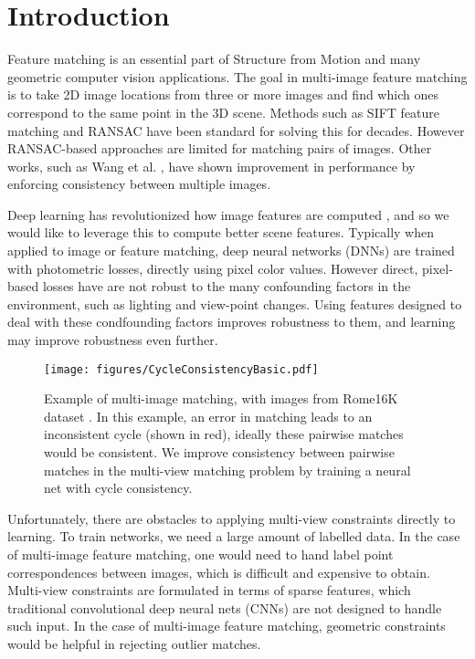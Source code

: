 \documentclass[10pt,twocolumn,letterpaper]{article}
\begin{document}
\section{Introduction}

Feature matching is an essential part of Structure from Motion and many geometric computer vision applications.
The goal in multi-image feature matching is to take 2D image locations from three or more images and find which ones correspond to the same point in the 3D scene.
Methods such as SIFT feature matching \cite{lowe2004distinctive} and RANSAC \cite{fischler1981random} have been standard for solving this for decades.
However RANSAC-based approaches are limited for matching pairs of images.
Other works, such as Wang et al. \cite{wang2017multi}, have shown improvement in performance by enforcing consistency between multiple images.

Deep learning has revolutionized how image features are computed \cite{yi2016lift}, and so we would like to leverage this to compute better scene features.
Typically when applied to image or feature matching, deep neural networks (DNNs) are trained with photometric losses, directly using pixel color values.
However direct, pixel-based losses have are not robust to the many confounding factors in the environment, such as lighting and view-point changes.
Using features designed to deal with these condfounding factors improves robustness to them, 
and learning may improve robustness even further.

\begin{figure}[t]
\begin{center}
  \texttt{[image: figures/CycleConsistencyBasic.pdf]}
\end{center}
  \caption{
    Example of multi-image matching, with images from Rome16K dataset \cite{li2010location}.
    In this example, an error in matching leads to an inconsistent cycle (shown in red), ideally these pairwise matches would be consistent.
    We improve consistency between pairwise matches in the multi-view matching problem by training a neural net with cycle consistency.
  }
\label{fig:cycconsistex}
\label{fig:onecol}
\end{figure}

Unfortunately, there are obstacles to applying multi-view constraints directly to learning. 
To train networks, we need a large amount of labelled data.
In the case of multi-image feature matching, one would need to hand label point correspondences between images, which is difficult and expensive to obtain.
Multi-view constraints are formulated in terms of sparse features, which traditional convolutional deep neural nets (CNNs) are not designed to handle such input.
In the case of multi-image feature matching, geometric constraints would be helpful in rejecting outlier matches.
\end{document}
